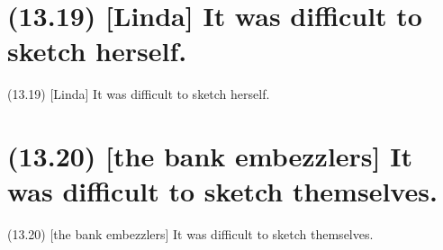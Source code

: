 \documentclass{article}
\begin{document}
\clearpage

%
%

\section*{(13.19) [Linda] It was difficult to sketch herself.}

\bigbreak
\begin{enumerate*}
\item[(13.19)] [Linda] It was difficult to sketch herself.
\end{enumerate*}
\bigbreak

\bigbreak
\begin{minipage}{\textwidth}
\end{minipage}
\bigbreak

\clearpage

%
%

\section*{(13.20) [the bank embezzlers] It was difficult to sketch themselves.}

\bigbreak
\begin{enumerate*}
\item[(13.20)] [the bank embezzlers] It was difficult to sketch themselves.
\end{enumerate*}
\bigbreak

\bigbreak
\begin{minipage}{\textwidth}
\end{minipage}
\bigbreak
\end{document}
